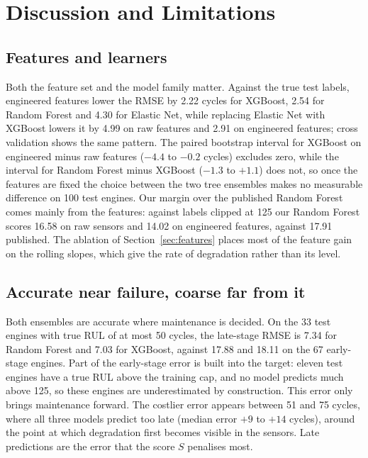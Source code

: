 \section{Discussion and Limitations}
\label{sec:discussion}

\subsection{Features and learners}
Both the feature set and the model family matter. Against the true test
labels, engineered features lower the RMSE by 2.22 cycles for XGBoost,
2.54 for Random Forest and 4.30 for Elastic Net, while replacing Elastic
Net with XGBoost lowers it by 4.99 on raw features and 2.91 on engineered
features; cross validation shows the same pattern. The paired bootstrap
interval for XGBoost on engineered minus raw features ($-4.4$ to $-0.2$
cycles) excludes zero, while the interval for Random Forest minus XGBoost
($-1.3$ to $+1.1$) does not, so once the features are fixed the choice
between the two tree ensembles makes no measurable difference on 100 test
engines. Our margin over the published Random Forest~\cite{zhang2017modbne}
comes mainly from the features: against labels clipped at 125 our Random
Forest scores 16.58 on raw sensors and 14.02 on engineered features,
against 17.91 published. The ablation of
Section~\ref{sec:features} places most of the feature gain on the rolling
slopes, which give the rate of degradation rather than its level.

\subsection{Accurate near failure, coarse far from it}
Both ensembles are accurate where maintenance is decided. On the 33 test
engines with true RUL of at most 50 cycles, the late-stage RMSE is 7.34
for Random Forest and 7.03 for XGBoost, against 17.88 and 18.11 on the 67
early-stage engines. Part of the early-stage error is built into the
target: eleven test engines have a true RUL above the training cap, and
no model predicts much above 125, so these engines are underestimated by
construction. This error only brings maintenance forward. The costlier
error appears between 51 and 75 cycles, where all three models predict too
late (median error $+9$ to $+14$ cycles), around the point at which
degradation first becomes visible in the sensors. Late predictions are the
error that the score $S$ penalises most.


